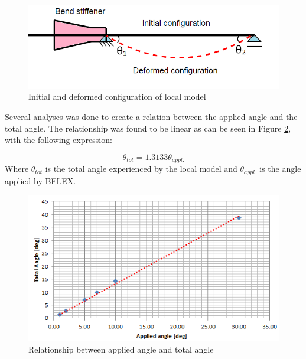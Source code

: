 \begin{figure}[H]
\centering
\includegraphics[scale=0.8]{figures/anglecorr}
\caption[Initial and deformed configuration of local model]{Initial and deformed configuration of local model}
 \label{fig:anglecorr}
\end{figure}

\noindent Several analyses was done to create a relation between the applied angle and the total angle. The relationship was found to be linear as can be seen in Figure \ref{fig:anglerel}, with the following expression:

\begin{equation}
    \theta_{tot}=1.3133\theta_{appl.}
\end{equation}
Where $\theta_{tot}$ is the total angle experienced by the local model and $\theta_{appl.}$ is the angle applied by BFLEX.
\begin{figure}[H]
\centering
\includegraphics[scale=0.8]{figures/anglerel}
\caption[Relationship between applied angle and total angle]{Relationship between applied angle and total angle}
 \label{fig:anglerel}
\end{figure}

